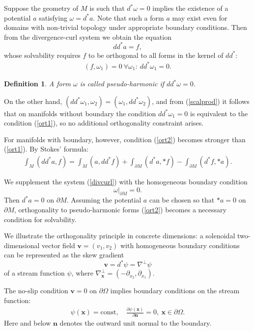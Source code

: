 \documentclass[a4paper]{article}
\newcommand{\bx}{\mathbf{x}}
\newcommand{\bv}{\mathbf{v}}
\newcommand{\bn}{\mathbf{n}}
\newtheorem{definition}{Definition}[section]
\begin{document}
Suppose the geometry of $M$ is such that $d^*\omega=0$ implies the existence of a potential $a$ satisfying $\omega = d^*a$. Note that such a form $a$ may exist even for domains with non-trivial topology under appropriate boundary conditions.
Then from the divergence-curl system we obtain the equation
$$d d^* a= f,$$
whose solvability requires $f$ to be orthogonal to all forms in the kernel of $dd^*$:
\begin{align}\label{ort2}
( f,\omega_1) = 0~\forall \omega_1:~dd^*\omega_1=0.
\end{align}

\begin{definition} A form $\omega$ is called \emph{pseudo-harmonic} if $dd^*\omega=0$.
\end{definition}

On the other hand, $(dd^* \omega_1, \omega_2) = (\omega_1, dd^* \omega_2)$, and from (\ref{scalprod}) it follows that on manifolds without boundary the condition $dd^*\omega_1=0$ is equivalent to the condition (\ref{ort1}), so no additional orthogonality constraint arises.

For manifolds with boundary, however, condition (\ref{ort2}) becomes stronger than (\ref{ort1}). By Stokes' formula:
\begin{align*}
\int_M (dd^* a,  f) = 
\int_M ( a, dd^*  f) +
\int_{\partial M} (d^* a, * f)
- \int_{\partial M} (d^* f, *a).
\end{align*}

We supplement the system (\ref{divcurl}) with the homogeneous boundary condition
$$
\omega\big|_{\partial M} = 0.
$$
Then $d^* a =0$ on $\partial M$. Assuming the potential $a$ can be chosen so that $* a = 0$ on $\partial M$, orthogonality to pseudo-harmonic forms (\ref{ort2}) becomes a necessary condition for solvability.

\vskip0.5cm
We illustrate the orthogonality principle in concrete dimensions: a solenoidal two-dimen\-si\-onal vector field $\bv=(v_1,v_2)$ with homogeneous boundary conditions can be represented as the skew gradient
$$\bv = d^*\psi = \nabla^\perp \psi$$
of a stream function $\psi$, where $\nabla_\bx^\perp = (-\partial_{x_2}, \partial_{x_1})$.

The no-slip condition $\bv=0$ on $\partial \Omega$ implies boundary conditions on the stream function:
\begin{align}\label{streamboundarycond}
\psi(\bx)= \mathrm{const}, \quad \frac {\partial \psi (\bx)}{\partial \bn} =0,~\bx \in \partial \Omega.
\end{align}
Here and below $\bn$ denotes the outward unit normal to the boundary.
\end{document}
